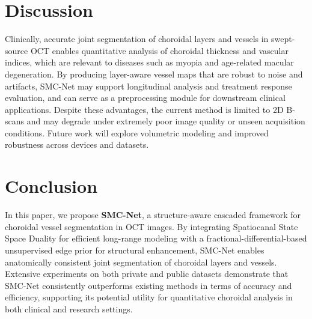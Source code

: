 \documentclass[lettersize,journal]{IEEEtran}
\begin{document}
\section{Discussion}
{\color{red}
Clinically, accurate joint segmentation of choroidal layers and vessels in swept-source OCT enables quantitative analysis of choroidal thickness and vascular indices, which are relevant to diseases such as myopia and age-related macular degeneration. By producing layer-aware vessel maps that are robust to noise and artifacts, SMC-Net may support longitudinal analysis and treatment response evaluation, and can serve as a preprocessing module for downstream clinical applications. Despite these advantages, the current method is limited to 2D B-scans and may degrade under extremely poor image quality or unseen acquisition conditions. Future work will explore volumetric modeling and improved robustness across devices and datasets.
}
\section{Conclusion}
{\color{red}
In this paper, we propose \textbf{SMC-Net}, a structure-aware cascaded framework for choroidal vessel segmentation in OCT images.
By integrating Spatiocanal State Space Duality for efficient long-range modeling with a fractional-differential-based unsupervised edge prior for structural enhancement, SMC-Net enables anatomically consistent joint segmentation of choroidal layers and vessels.
Extensive experiments on both private and public datasets demonstrate that SMC-Net consistently outperforms existing methods in terms of accuracy and efficiency, supporting its potential utility for quantitative choroidal analysis in both clinical and research settings.
}

 

\end{document}
